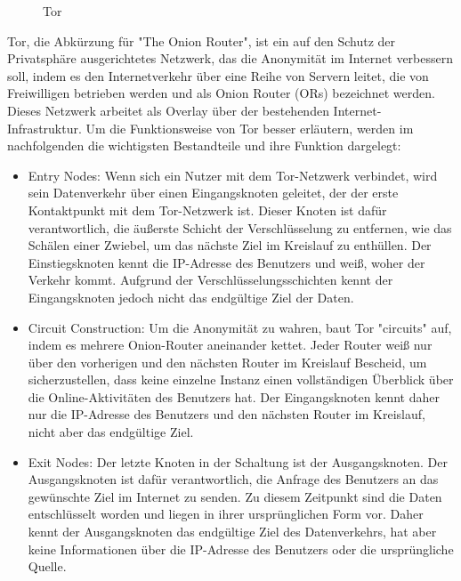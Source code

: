 \begin{figure}[h!]
    \centering
    
    \caption{Tor}
    \label{imgs:tor}
\end{figure}

Tor, die Abkürzung für "The Onion Router", ist ein auf den Schutz der Privatsphäre ausgerichtetes Netzwerk, das die Anonymität im Internet verbessern soll, indem es den Internetverkehr über eine Reihe von Servern leitet, die von Freiwilligen betrieben werden und als Onion Router (ORs) bezeichnet werden. Dieses Netzwerk arbeitet als Overlay über der bestehenden Internet-Infrastruktur. Um die Funktionsweise von Tor besser erläutern, werden im nachfolgenden die wichtigsten Bestandteile und ihre Funktion dargelegt:

\begin{itemize}

\item Entry Nodes: Wenn sich ein Nutzer mit dem Tor-Netzwerk verbindet, wird sein Datenverkehr über einen Eingangsknoten geleitet, der der erste Kontaktpunkt mit dem Tor-Netzwerk ist. Dieser Knoten ist dafür verantwortlich, die äußerste Schicht der Verschlüsselung zu entfernen, wie das Schälen einer Zwiebel, um das nächste Ziel im Kreislauf zu enthüllen. Der Einstiegsknoten kennt die IP-Adresse des Benutzers und weiß, woher der Verkehr kommt. Aufgrund der Verschlüsselungsschichten kennt der Eingangsknoten jedoch nicht das endgültige Ziel der Daten.

\item Circuit Construction: Um die Anonymität zu wahren, baut Tor "circuits" auf, indem es mehrere Onion-Router aneinander kettet. Jeder Router weiß nur über den vorherigen und den nächsten Router im Kreislauf Bescheid, um sicherzustellen, dass keine einzelne Instanz einen vollständigen Überblick über die Online-Aktivitäten des Benutzers hat. Der Eingangsknoten kennt daher nur die IP-Adresse des Benutzers und den nächsten Router im Kreislauf, nicht aber das endgültige Ziel.

\item Exit Nodes: Der letzte Knoten in der Schaltung ist der Ausgangsknoten. Der Ausgangsknoten ist dafür verantwortlich, die Anfrage des Benutzers an das gewünschte Ziel im Internet zu senden. Zu diesem Zeitpunkt sind die Daten entschlüsselt worden und liegen in ihrer ursprünglichen Form vor. Daher kennt der Ausgangsknoten das endgültige Ziel des Datenverkehrs, hat aber keine Informationen über die IP-Adresse des Benutzers oder die ursprüngliche Quelle.

\end{itemize}

